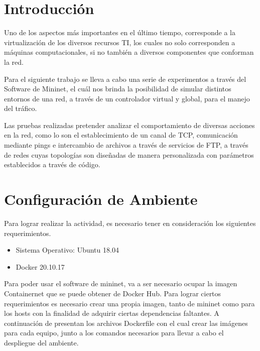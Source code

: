 \documentclass[10pt]{article}
\begin{document}
\section{Introducción}

\noindent
Uno de los aspectos más importantes en el último tiempo, corresponde a la virtualización de los diversos recursos TI, los cuales no solo corresponden a máquinas computacionales, si no también a diversos componentes que conforman la red. 
\newline

\noindent
Para el siguiente trabajo se lleva a cabo una serie de experimentos a través del Software de Mininet, el cuál nos brinda la posibilidad de simular distintos entornos de una red, a través de un controlador virtual y global, para el manejo del tráfico.
\newline

\noindent
Las pruebas realizadas pretender analizar el comportamiento de diversas acciones en la red, como lo son el establecimiento de un canal de TCP, comunicación mediante pings e intercambio de archivos a través de servicios de FTP, a través de redes cuyas topologías son diseñadas de manera personalizada con parámetros establecidos a través de código.

\section{Configuración de Ambiente}
Para lograr realizar la actividad, es necesario tener en consideración los siguientes requerimientos.

\begin{itemize}
    \item Sistema Operativo: Ubuntu 18.04
    
    \item Docker 20.10.17
    
\end{itemize}

Para poder usar el software de mininet, va a ser necesario ocupar la imagen Containernet que se puede obtener de Docker Hub. Para lograr ciertos requerimientos es necesario crear una propia imagen, tanto de mininet como para los hosts con la finalidad de adquirir ciertas dependencias faltantes. A continuación de presentan los archivos Dockerfile con el cual crear las imágenes para cada equipo, junto a los comandos necesarios para llevar a cabo el despliegue del ambiente.
\end{document}
